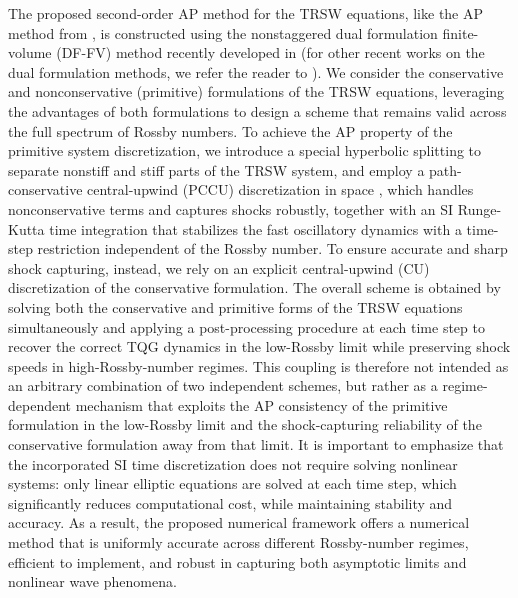 \documentclass[a4paper,11pt,twoside]{article}
\numberwithin{equation}{section}
\numberwithin{figure}{section}
\numberwithin{table}{section}
\newcommand{\RIIIcolor}[1]{{\leavevmode\color{magenta} #1}}
\begin{document}
The proposed second-order AP method for the TRSW equations, like the AP method from \cite{CKKM}, is constructed using the nonstaggered dual 
formulation finite-volume (DF-FV) method recently developed in \cite{CFKM} (for other recent works on the dual formulation methods, we refer
the reader to \cite{Abgrall_2023,Abgrall_2024,Abgrall_2025}). We consider the conservative and nonconservative (primitive) formulations of 
the TRSW equations, leveraging the advantages of both formulations to design a scheme that remains valid across the full spectrum of Rossby 
numbers. To achieve the AP property of the primitive system discretization, we introduce a special hyperbolic splitting to separate nonstiff
and stiff parts of the TRSW system, and employ a path-conservative central-upwind (PCCU) discretization in space
\cite{CKKM,Chu_2022,Castro_2019}, which handles nonconservative terms and captures shocks robustly, together with an SI Runge-Kutta time
integration that stabilizes the fast oscillatory dynamics with a time-step restriction independent of the Rossby number. 
\RIIIcolor{
	To ensure accurate and sharp shock capturing, instead, we rely on an explicit central-upwind (CU) discretization of the conservative formulation.
	The overall scheme is obtained by solving both the conservative and primitive forms of the TRSW equations simultaneously and applying a post-processing procedure at each time step to recover the correct TQG dynamics in the low-Rossby limit while preserving shock speeds in high-Rossby-number regimes.
	This coupling is therefore not intended as an arbitrary combination of two independent schemes, but rather as a regime-dependent mechanism that exploits the AP consistency of the primitive formulation in the low-Rossby limit and the shock-capturing reliability of the conservative formulation away from that limit.
}
%
It is important to emphasize that the incorporated SI time discretization does not require solving nonlinear systems: only linear
elliptic equations are solved at each time step, which significantly reduces computational cost, while maintaining stability and accuracy.
As a result, the proposed numerical framework offers a numerical method that is uniformly accurate across different Rossby-number regimes,
efficient to implement, and robust in capturing both asymptotic limits and nonlinear wave phenomena.
\end{document}
